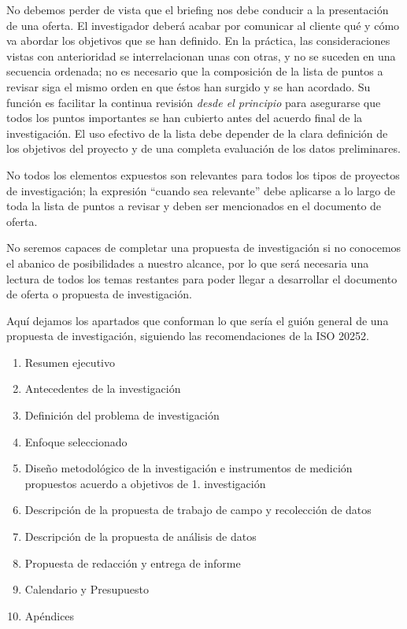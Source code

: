 \documentclass[
]{book}
\providecommand{\tightlist}{%
  \setlength{\itemsep}{0pt}\setlength{\parskip}{0pt}}
\begin{document}
No debemos perder de vista que el briefing nos debe conducir a la presentación de una oferta. El investigador deberá acabar por comunicar al cliente qué y cómo va abordar los objetivos que se han definido. En la práctica, las consideraciones vistas con anterioridad se interrelacionan unas con otras, y no se suceden en una secuencia ordenada; no es necesario que la composición de la lista de puntos a revisar siga el mismo orden en que éstos han surgido y se han acordado. Su función es facilitar la continua revisión \emph{desde el principio} para asegurarse que todos los puntos importantes se han cubierto antes del acuerdo final de la investigación. El uso efectivo de la lista debe depender de la clara definición de los objetivos del proyecto y de una completa evaluación de los datos preliminares.

No todos los elementos expuestos son relevantes para todos los tipos de proyectos de investigación; la expresión ``cuando sea relevante'' debe aplicarse a lo largo de toda la lista de puntos a revisar y deben ser mencionados en el documento de oferta.

No seremos capaces de completar una propuesta de investigación si no conocemos el abanico de posibilidades a nuestro alcance, por lo que será necesaria una lectura de todos los temas restantes para poder llegar a desarrollar el documento de oferta o propuesta de investigación.

Aquí dejamos los apartados que conforman lo que sería el guión general de una propuesta de investigación, siguiendo las recomendaciones de la ISO 20252.

\begin{enumerate}
\def\labelenumi{\arabic{enumi}.}
\tightlist
\item
  Resumen ejecutivo
\item
  Antecedentes de la investigación
\item
  Definición del problema de investigación
\item
  Enfoque seleccionado
\item
  Diseño metodológico de la investigación e instrumentos de medición propuestos acuerdo a objetivos de 1. investigación
\item
  Descripción de la propuesta de trabajo de campo y recolección de datos
\item
  Descripción de la propuesta de análisis de datos
\item
  Propuesta de redacción y entrega de informe
\item
  Calendario y Presupuesto
\item
  Apéndices
\end{enumerate}
\end{document}
